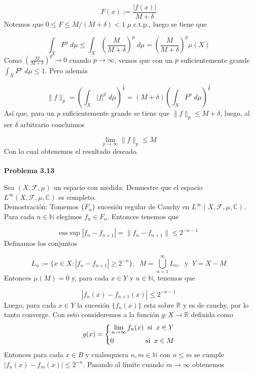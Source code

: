 \documentclass[12pt]{article}
\begin{document}
    \[F(x) := \frac{|f(x)|}{M+\delta}\]
    Notemos que $0 \leq F \leq M/(M+\delta) < 1\; \mu\;\text{c.t.p.}$, luego se tiene que 

    \[\int_X F^p\;d\mu \leq \int_X \left(\frac{M}{M+\delta}\right)^p\;d\mu = \left(\frac{M}{M+\delta}\right)^p\mu(X)\]
    Como $\left(\frac{M}{M+\delta}\right)^p\rightarrow 0$ cuando $p\rightarrow \infty$,
    vemos que con un $p$ suficientemente grande $\int_X F^p\;d\mu \leq 1$. Pero 
    adem\'as  

    \[\|f\|_p = \left( \int_X |f|^p\;d\mu \right)^{\frac{1}{p}} = (M+\delta)\left(\int_X F^p\;d\mu\right)^{\frac{1}{p}}\]
    As\'i que, para un $p$ suficientemente grande se tiene que $\|f\|_p \leq M+\delta$, 
    luego, al ser $\delta$ arbitrario concluimos 

    \[\lim_{p\rightarrow \infty} \|f\|_p \leq M\]
    Con lo cual obtenemos el resultado deseado.
    \\ \\ 

    \textbf{Problema 3.13}

    Sea $(X,\mathcal{F},\mu)$ un espacio con medida. Demuestre que el espacio 
    $L^{\infty}(X,\mathcal{F},\mu,\mathbb{C})$ es completo.
    \\

    Demostraci\'on: Tomemos $\{F_n\}$ sucesi\'on regular de Cauchy en 
    $L^{\infty}(X,\mathcal{F},\mu,\mathbb{C})$. Para cada $n\in \mathbb{N}$ elegimos 
    $f_n\in F_n$. Entonces tenemos que 

    \[\mathrm{ess}\sup|f_n-f_{n+1}| = \|f_n-f_{n+1}\| \leq 2^{-n-1}\]
    Definamos los conjuntos 

    \[L_n := \{x\in X : |f_n-f_{n+1}| \geq 2^{-n}\},\;\; M = \bigcup_{n=1}^{\infty}L_n,\;\;\text{y}\;\; Y = X-M\]
    Entonces $\mu(M) = 0$ y, para cada $x\in Y$ y $n\in \mathbb{N}$, tenemos que 

    \[|f_n(x)-f_{n+1}(x)| \leq 2^{-n-1}\]
    Luego, para cada $x\in Y$ la sucesi\'on $\{f_n(x)\}$ esta sobre $\mathbb{R}$ y es de
    cauchy, por lo tanto converge. Con esto consideremos a la funci\'on 
    $g:X\rightarrow \mathbb{R}$ definida como
    \begin{equation*}
        g(x) = \left\{
        \begin{aligned}
            \lim_{n\rightarrow \infty} f_n(x)\;\; \text{si}\;\; x\in Y \\
            0 \hspace*{46pt} \text{si}\;\; x\in M
        \end{aligned}
        \right.
    \end{equation*}
    Entonces para cada $x\in B$ y cualesquiera $n,m\in \mathbb{N}$ con $n\leq m$ se cumple 
    $|f_n(x)-f_m(x)| \leq 2^{-n}$. Pasando al l\'imite cuando $m\rightarrow \infty$ 
    obtenemos 
\end{document}

